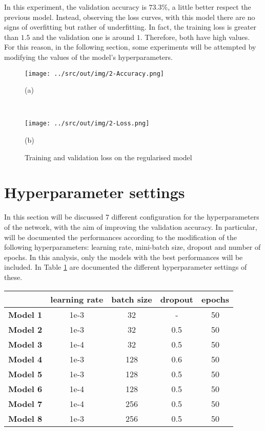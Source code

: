 \documentclass[a4paper,12pt]{article} %
\begin{document}
	In this experiment, the validation accuracy is $73.3\%$, a little better 
	respect the previous model.
	Instead, observing the loss curves, with this model there are no signs of 
	overfitting but rather of underfitting. In fact, the training loss is  
	greater than $1.5$ and the validation one is around $1$. Therefore, both 
	have high values. For this reason, in the following section, some 
	experiments will be attempted by modifying the values of the model's 
	hyperparameters.
	
	\begin{figure}[htb]
		\begin{minipage}[c]{.49\textwidth}
			\centering
			\texttt{[image: ../src/out/img/2-Accuracy.png]}
			\caption*{(a)}
		\end{minipage}
		~
		\begin{minipage}[c]{.49\textwidth}
			\centering
			\texttt{[image: ../src/out/img/2-Loss.png]}
			\caption*{(b)}
		\end{minipage}
		\caption{Training and validation loss on the regularised model}
		\label{fig:model1-performance}
	\end{figure}
	  
	\section{Hyperparameter settings}
	\label{section:hyperparam}
	
	In this section will be discussed $7$ different configuration for the 
	hyperparameters of the network, with the aim of improving the validation 
	accuracy. In particular, will be documented the performances according to 
	the modification of the following hyperparameters: learning rate, 
	mini-batch size, dropout and number of epochs. In this analysis, only the 
	models with the best performances will be included. In Table 
	\ref{tab:param1} are documented the different hyperparameter settings of 
	these. 
	
	\begin{table}[htb]
		\centering
		\begin{tabular}{l@{\hspace{.5cm}}cccc}
			\toprule
			& \textbf{learning rate} & \textbf{batch size} & \textbf{dropout} & 
			\textbf{epochs} \\
			\midrule
			\textbf{Model 1}  & {1e-3} & {32}  &  -  & 50\\
			\textbf{Model 2}  & {1e-3} & {32}  & 0.5 & 50\\
			\textbf{Model 3}  & {1e-4} & {32}  & 0.5 & 50 \\
			\textbf{Model 4}  & {1e-3} & {128} & 0.6 & 50 \\
			\textbf{Model 5}  & {1e-3} & {128} & 0.5 & 50 \\
			\textbf{Model 6} & {1e-4} & {128} & 0.5 & 50 \\
			\textbf{Model 7}  & {1e-4} & {256} & 0.5 & 50 \\
			\textbf{Model 8}  & {1e-3} & {256} & 0.5 & 50 \\
			\bottomrule 
		\end{tabular}
		\label{tab:param1}
	\end{table}
\end{document}
